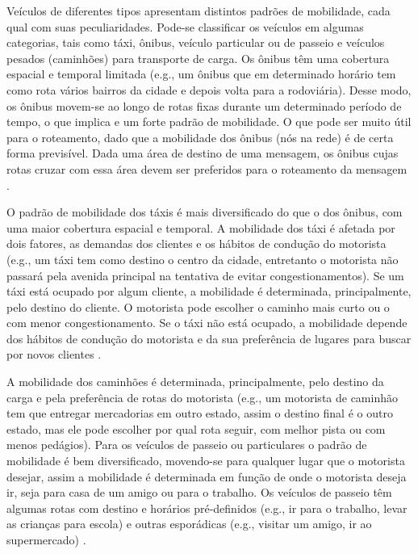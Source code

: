 \documentclass[mestrado, pre-defesa, english, brazil]{packages/icmc}
\begin{document}
Veículos de diferentes tipos apresentam distintos padrões de mobilidade, cada qual com suas peculiaridades. Pode-se classificar os veículos em algumas categorias, tais como táxi, ônibus, veículo particular ou de passeio e veículos pesados (caminhões) para transporte de carga. Os ônibus têm uma cobertura espacial e temporal limitada (e.g., um ônibus que em determinado horário tem como rota vários bairros da cidade e depois volta para a rodoviária). Desse modo, os ônibus movem-se ao longo de rotas fixas durante um determinado período de tempo, o que implica e um forte padrão de mobilidade. O que pode ser muito útil para o roteamento, dado que a mobilidade dos ônibus (nós na rede) é de certa forma previsível. Dada uma área de destino de uma mensagem, os ônibus cujas rotas cruzar com essa área devem ser preferidos para o roteamento da mensagem \cite{Zhang-2014,Zhang-2012}.

O padrão de mobilidade dos táxis é mais diversificado do que o dos ônibus, com uma maior cobertura espacial e temporal. A mobilidade dos táxi é afetada por dois fatores, as demandas dos clientes e os hábitos de condução do motorista (e.g., um táxi tem como destino o centro da cidade, entretanto o motorista não passará pela avenida principal na tentativa de evitar congestionamentos). Se um táxi está ocupado por algum cliente, a mobilidade é determinada, principalmente, pelo destino do cliente. O motorista pode escolher o caminho mais curto ou o com menor congestionamento. Se o táxi não está ocupado, a mobilidade depende dos hábitos de condução do motorista e da sua preferência de lugares para buscar por novos clientes \cite{Zhang-2012,Zhang-2014}.

A mobilidade dos caminhões é determinada, principalmente, pelo destino da carga e pela preferência de rotas do motorista (e.g., um motorista de caminhão tem que entregar mercadorias em outro estado, assim o destino final é o outro estado, mas ele pode escolher por qual rota seguir, com melhor pista ou com menos pedágios). Para os veículos de passeio ou particulares o padrão de mobilidade é bem diversificado, movendo-se para qualquer lugar que o motorista desejar, assim a mobilidade é determinada em função de onde o motorista deseja ir, seja para casa de um amigo ou para o trabalho. Os veículos de passeio têm algumas rotas com destino e horários pré-definidos (e.g., ir para o trabalho, levar as crianças para escola) e outras esporádicas (e.g., visitar um amigo, ir ao supermercado) \cite{Cunha-2014}.

\end{document}
